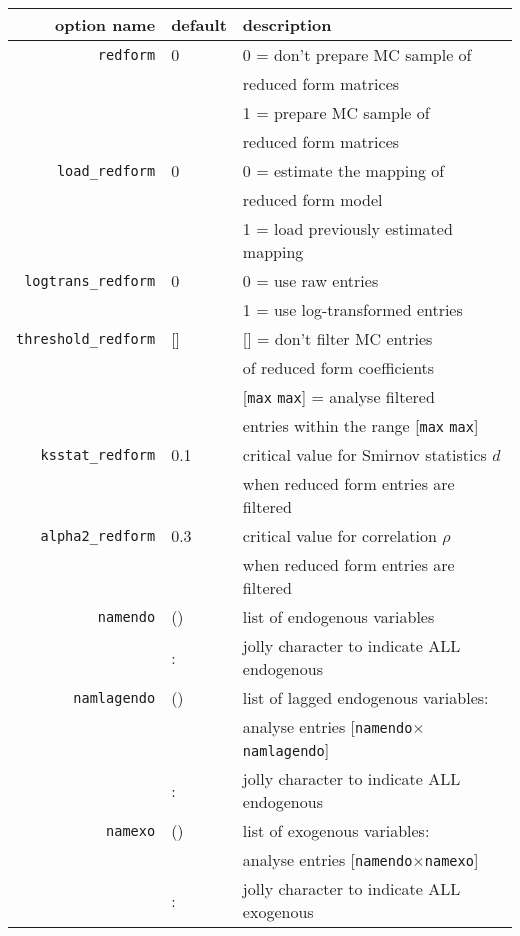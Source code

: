 \documentclass[12pt,a4paper]{article}
\begin{document}
\begin{tabular}{r|l|l}
                option name & default & description  \\ \hline
              \verb"redform"& 0& 0 = don't prepare MC sample of \\
                            &  & reduced form matrices \\
                            &  & 1 = prepare MC sample of \\
                            &  & reduced form matrices \\
         \verb"load_redform"& 0& 0 = estimate the mapping of \\
                            &  & reduced form model\\
                            &  & 1 = load previously estimated mapping\\
     \verb"logtrans_redform"& 0& 0 = use raw entries\\
                            &  & 1 = use log-transformed entries \\
    \verb"threshold_redform"& []& [] = don't filter MC entries \\
                            &   & of reduced form coefficients\\
                            &   & [\verb"max" \verb"max"] =  analyse filtered \\
                            &   & entries within the range [\verb"max" \verb"max"] \\
       \verb"ksstat_redform"& 0.1& critical value for Smirnov statistics $d$ \\
                            &   & when reduced form entries are filtered\\
       \verb"alpha2_redform"& 0.3& critical value for correlation $\rho$ \\
                            &   & when reduced form entries are filtered\\
              \verb"namendo"& () & list of endogenous variables \\
                            & : & jolly character to indicate ALL endogenous \\
           \verb"namlagendo"& () & list of lagged endogenous variables:\\
                            &   & analyse entries [\verb"namendo"$\times$\verb"namlagendo"]\\
                            & : & jolly character to indicate ALL endogenous \\
               \verb"namexo"& ()& list of exogenous variables:\\
                            &   & analyse entries
                            [\verb"namendo"$\times$\verb"namexo"]\\
                            & : & jolly character to indicate ALL exogenous  \\\hline
\end{tabular}
\vspace{0.5cm} \\
\end{document}
